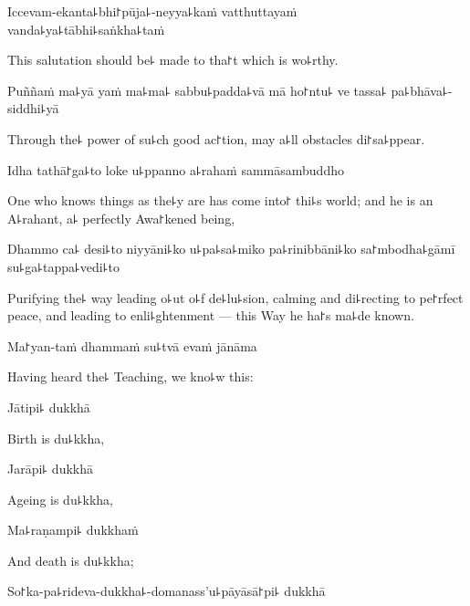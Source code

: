 Iccevam-ekanta꜕bhi꜓pūja꜕-neyya꜕kaṁ vatthuttayaṁ \\vanda꜕ya꜕tābhi꜕saṅkha꜕taṁ

\begin{english}
  This salutation should be꜕ made to tha꜓t which is wo꜕rthy.
\end{english}

Puññaṁ ma꜕yā yaṁ ma꜕ma꜕ sabbu꜕padda꜕vā mā ho꜓ntu꜕ ve tassa꜕ pa꜕bhāva꜕-siddhi꜕yā

\begin{english}
  Through the꜕ power of su꜕ch good ac꜓tion, may a꜕ll obstacles di꜓sa꜕ppear.
\end{english}

Idha tathā꜓ga꜕to loke u꜕ppanno a꜕rahaṁ sammāsambuddho

\begin{english}
  One who knows things as the꜕y are has come into꜓ thi꜕s world; and he is an A꜕rahant, a꜕ perfectly Awa꜓kened being,
\end{english}

Dhammo ca꜕ desi꜕to niyyāni꜕ko u꜕pa꜕sa꜕miko pa꜕rinibbāni꜕ko sa꜓mbodha꜕gāmī su꜕ga꜕tappa꜕vedi꜕to

\begin{english}
  Purifying the꜕ way leading o꜕ut o꜕f de꜕lu꜕sion, calming and di꜕recting to pe꜓rfect peace, and leading to enli꜕ghtenment --- this Way he ha꜓s ma꜕de known.
\end{english}

Ma꜓yan-taṁ dhammaṁ su꜕tvā evaṁ jānāma

\begin{english}
  Having heard the꜕ Teaching, we kno꜕w this:
\end{english}

Jātipi꜕ dukkhā

\begin{english}
  Birth is du꜕kkha,
\end{english}

Jarāpi꜕ dukkhā

\begin{english}
  Ageing is du꜕kkha,
\end{english}

Ma꜕raṇampi꜕ dukkhaṁ

\begin{english}
  And death is du꜕kkha;
\end{english}

So꜓ka-pa꜕rideva-dukkha꜕-domanass'u꜕pāyāsā꜓pi꜕ dukkhā

